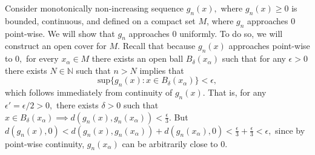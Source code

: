 \documentclass{article}
\numberwithin{equation}{section}
\begin{document}
\begin{enumerate}
\begin{enumerate}[label=(\alph*)]
        Consider monotonically non-increasing sequence $g_n(x),$ where $g_n(x)\ge0$ is bounded, continuous, and defined on a compact set $M$, where $g_n$ approaches $0$ point-wise. We will show that $g_n$ approaches $0$ uniformly. To do so, we will construct an open cover for $M.$ Recall that because $g_n(x)$ approaches point-wise to $0,$ for every $x_\alpha \in M$ there exists an open ball $B_{\delta}(x_\alpha)$ such that for any $\epsilon>0$ there exists $N\in \mathbb{N}$ such that $n>N$ implies that
        \begin{equation}
            \text{sup}\{g_n(x):x\in B_{\delta}(x_\alpha)\} < \epsilon,
        \end{equation}
        which follows immediately from continuity of $g_n(x).$ That is, for any $\epsilon'=\epsilon/2 > 0,$ there exists $\delta > 0$ such that $x\in B_{\delta}(x_\alpha) \implies d(g_n(x),g_n(x_\alpha)) < \frac{\epsilon}{3}.$ But $d(g_n(x),0) < d(g_n(x),g_n(x_\alpha))+d(g_n(x_\alpha),0) < \frac{\epsilon}{3} + \frac{\epsilon}{3} < \epsilon,$ since by point-wise continuity, $g_n(x_\alpha)$ can be arbitrarily close to $0.$


\end{enumerate}
\end{enumerate}
\end{document}
